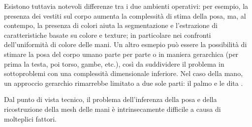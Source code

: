 Esistono tuttavia notevoli differenze tra i due ambienti operativi:
per esempio, la presenza dei vestiti sul corpo aumenta la complessità di stima della posa, ma, al contempo, la presenza di colori aiuta la segmentazione e l'estrazione di caratteristiche basate su colore e texture;
in particolare nei confronti dell'uniformità di colore delle mani.
Un altro esmepio può essere la possibilità di stimare la posa del corpo umano parte per parte o in maniera gerarchica (per prima la testa, poi torso, gambe, etc.), così da suddividere il problema in sottoproblemi con una complessità dimensionale inferiore.
Nel caso della mano, un approccio gerarchio rimarrebbe limitato a due sole parti: il palmo e le dita \cite{EROL200752}.

Dal punto di vista tecnico, il problema dell'inferenza della posa e della ricostruzione della mesh delle mani è intrinsecamente difficile a causa di molteplici fattori.

